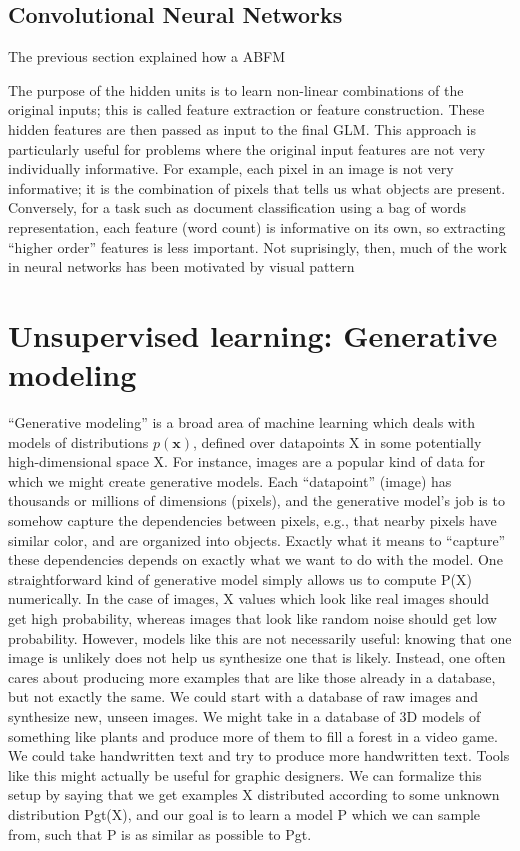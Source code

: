 \subsection{Convolutional Neural Networks}

The previous section explained how a ABFM

The purpose of the hidden units is to learn non-linear combinations of the original inputs; this
is called feature extraction or feature construction. These hidden features are then passed as
input to the final GLM. This approach is particularly useful for problems where the original input
features are not very individually informative. For example, each pixel in an image is not very
informative; it is the combination of pixels that tells us what objects are present. Conversely, for
a task such as document classification using a bag of words representation, each feature (word
count) is informative on its own, so extracting “higher order” features is less important. Not
suprisingly, then, much of the work in neural networks has been motivated by visual pattern




\section{Unsupervised learning: Generative modeling}
“Generative modeling” is a broad area of machine learning which deals with models of distributions $p(\bm{x})$, defined over datapoints X in some potentially high-dimensional space X. For instance, images are a popular kind of data for which we might create generative models. Each “datapoint” (image) has thousands or millions of dimensions (pixels), and the generative model’s job is to somehow capture the dependencies between pixels, e.g., that nearby
pixels have similar color, and are organized into objects. Exactly what it means to “capture” these dependencies depends on exactly what we want to do with the model. One straightforward kind of generative model simply allows us to compute P(X) numerically. In the case of images, X values  which look like real images should get high probability, whereas images that look like random noise should get low probability. However, models like this are not necessarily useful: knowing that one image is unlikely does not help us synthesize one that is likely. Instead, one often cares about producing more examples that are like those already in a database, but not exactly the same. We could start with a database of raw images and synthesize new, unseen images. We might take in a database of 3D models of something like plants and produce more of them to fill a forest in a video game. We could take handwritten text and try to produce more handwritten text. Tools like this might actually be useful for graphic designers. We can formalize this setup by saying that we get examples X distributed according to some unknown distribution Pgt(X), and our goal is to learn a model P which we can sample from, such that P is as similar as possible to Pgt.

